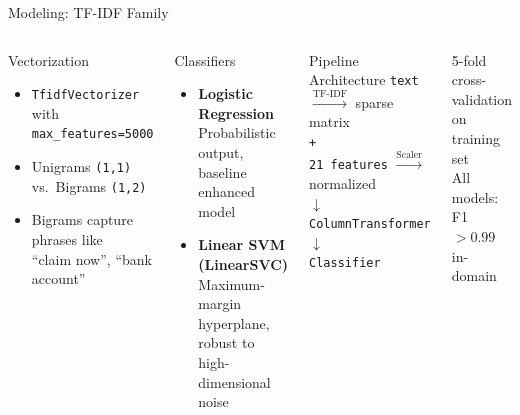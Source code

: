 \documentclass[aspectratio=169, 12pt]{beamer}
\begin{document}
\begin{frame}{Modeling: TF-IDF Family}
\begin{columns}[T]
\begin{block}{Vectorization}
\begin{itemize}
    \item \texttt{TfidfVectorizer} with \texttt{max\_features=5000}
    \item Unigrams \texttt{(1,1)} vs.\ Bigrams \texttt{(1,2)}
    \item Bigrams capture phrases like\\``claim now'', ``bank account''
\end{itemize}
\end{block}

\vspace{4pt}
\begin{block}{Classifiers}
\begin{itemize}
    \item \textbf{Logistic Regression}\\{\scriptsize Probabilistic output, baseline enhanced model}
    \item \textbf{Linear SVM (LinearSVC)}\\{\scriptsize Maximum-margin hyperplane, robust to high-dimensional noise}
\end{itemize}
\end{block}

\begin{block}{Pipeline Architecture}
\centering
\vspace{4pt}
{\small
\texttt{text} $\xrightarrow{\text{TF-IDF}}$ sparse matrix\\[6pt]
\texttt{+}\\[6pt]
\texttt{21 features} $\xrightarrow{\text{Scaler}}$ normalized\\[6pt]
$\downarrow$\\[6pt]
\texttt{ColumnTransformer}\\[6pt]
$\downarrow$\\[6pt]
\texttt{Classifier}
}
\vspace{4pt}
\end{block}

\vspace{4pt}
{\scriptsize\color{textMuted} 5-fold cross-validation on training set\\All models: F1 $> 0.99$ in-domain}
\end{columns}
\end{frame}
\end{document}
